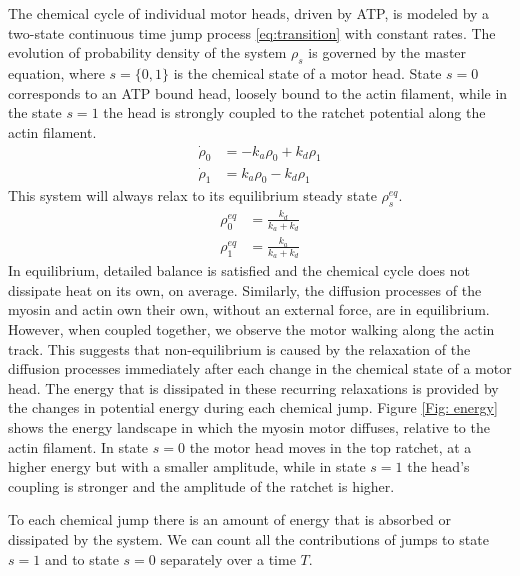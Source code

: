 \documentclass[aps,pre,twocolumn,showpacs,showkeys]{revtex4-1}
\begin{document}
The chemical cycle of individual motor heads, driven by ATP, is modeled by a two-state continuous time jump process \eqref{eq:transition} with constant rates.
The evolution of probability density of the system $\rho_s$ is governed by the master equation, where $s = \{0,1\}$ is the chemical state of a motor head. 
State $s=0$ corresponds to an ATP bound head, loosely bound to the actin filament, while in the state $s=1$ the head is strongly coupled to the ratchet potential along the actin filament.
\begin{align*}
\dot{\rho}_0 &= -k_a \rho_0 + k_d \rho_1 \\
\dot{\rho}_1 &= k_a \rho_0 - k_d \rho_1 
\end{align*}
This system will always relax to its equilibrium steady state $\rho^{eq}_s$.
\begin{align*}
\rho^{eq}_0 &= \frac{k_d}{k_a+k_d}\\
\rho^{eq}_1 &= \frac{k_a}{k_a+k_d} 
\end{align*}
In equilibrium, detailed balance is satisfied and the chemical cycle does not dissipate heat on its own, on average.
Similarly, the diffusion processes of the myosin and actin own their own, without an external force, are in equilibrium.
However, when coupled together, we observe the motor walking along the actin track. 
This suggests that non-equilibrium is caused by the relaxation of the diffusion processes immediately after each change in the chemical state of a motor head. 
The energy that is dissipated in these recurring relaxations is provided by the changes in potential energy during each chemical jump. 
Figure \ref{Fig: energy} shows the energy landscape in which the myosin motor diffuses, relative to the actin filament. 
In state $s=0$ the motor head moves in the top ratchet, at a higher energy but with a smaller amplitude, while in state $s=1$ the head's coupling is stronger and the amplitude of the ratchet is higher. 


To each chemical jump there is an amount of energy that is absorbed or dissipated by the system. 
We can count all the contributions of jumps to state $s=1$ and to state $s=0$ separately over a time $T$.
\end{document}
